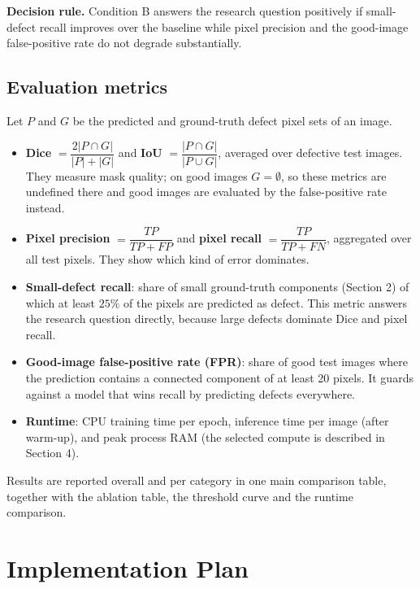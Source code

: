 \documentclass[11pt,a4paper]{article}
\begin{document}
\textbf{Decision rule.} Condition B answers the research question positively if small-defect recall improves over the baseline while pixel precision and the good-image false-positive rate do not degrade substantially.

\subsection{Evaluation metrics}

Let $P$ and $G$ be the predicted and ground-truth defect pixel sets of an image.
\begin{itemize}
  \item \textbf{Dice} $=\dfrac{2|P\cap G|}{|P|+|G|}$ and \textbf{IoU} $=\dfrac{|P\cap G|}{|P\cup G|}$, averaged over defective test images. They measure mask quality; on good images $G=\emptyset$, so these metrics are undefined there and good images are evaluated by the false-positive rate instead.
  \item \textbf{Pixel precision} $=\dfrac{TP}{TP+FP}$ and \textbf{pixel recall} $=\dfrac{TP}{TP+FN}$, aggregated over all test pixels. They show which kind of error dominates.
  \item \textbf{Small-defect recall}: share of small ground-truth components (Section 2) of which at least $25\%$ of the pixels are predicted as defect. This metric answers the research question directly, because large defects dominate Dice and pixel recall.
  \item \textbf{Good-image false-positive rate (FPR)}: share of good test images where the prediction contains a connected component of at least 20 pixels. It guards against a model that wins recall by predicting defects everywhere.
  \item \textbf{Runtime}: CPU training time per epoch, inference time per image (after warm-up), and peak process RAM (the selected compute is described in Section 4).
\end{itemize}
Results are reported overall and per category in one main comparison table, together with the ablation table, the threshold curve and the runtime comparison.

\section{Implementation Plan}
\end{document}
